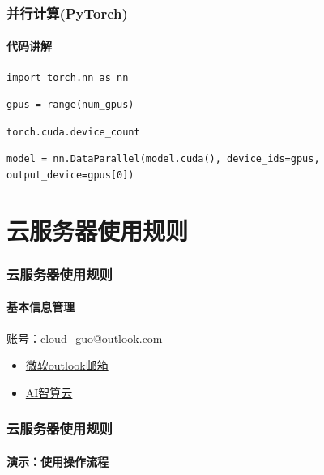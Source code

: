 \documentclass[10pt]{beamer}
\begin{document}
        \begin{frame}[fragile]
            \frametitle{并行计算(PyTorch)}
                \framesubtitle{代码讲解}
                    \begin{lstlisting}[basicstyle=\small]
import torch.nn as nn
                    \end{lstlisting}
                    \begin{lstlisting}[basicstyle=\small]
gpus = range(num_gpus)
                    \end{lstlisting}
                    \begin{lstlisting}[basicstyle=\small]
torch.cuda.device_count
                    \end{lstlisting}
                    \begin{lstlisting}[basicstyle=\small]
model = nn.DataParallel(model.cuda(), device_ids=gpus, output_device=gpus[0]) 
                    \end{lstlisting}

        \end{frame}

    \section{云服务器使用规则}
        \begin{frame}
            \frametitle{云服务器使用规则}
                \framesubtitle{基本信息管理}
                    账号：\href{mailto: cloud\_guo@outlook.com}{cloud\_guo@outlook.com} \\
                    \hspace*{\fill}
                    \begin{itemize}
                        \item {\href{https://outlook.live.com/owa/}{微软outlook邮箱}}
                        \item {\href{https://ai.blsc.cn/\#/login}{AI智算云}}
                    \end{itemize}

        \end{frame}

        \begin{frame}
            \frametitle{云服务器使用规则}
                \framesubtitle{演示：使用操作流程}


        \end{frame}
\end{document}
